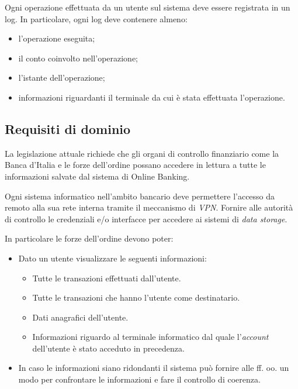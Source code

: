Ogni operazione effettuata da un utente sul sistema deve essere registrata in un log.
In particolare, ogni log deve contenere almeno:
\begin{itemize}
	\item l'operazione eseguita;
	\item il conto coinvolto nell'operazione;
	\item l'istante dell'operazione;
	\item informazioni riguardanti il terminale da cui \`e stata effettuata l'operazione.
\end{itemize}

\subsection{Requisiti di dominio}

La legislazione attuale richiede che gli organi di controllo finanziario come la Banca d'Italia e le forze dell'ordine possano accedere in lettura a tutte le informazioni salvate dal sistema di Online Banking.

Ogni sistema informatico nell'ambito bancario deve permettere l'accesso da remoto alla sua rete interna tramite il meccanismo di \emph{VPN}.
Fornire alle autorit\`a di controllo le credenziali e/o interfacce per accedere ai sistemi di \emph{data storage}.

In particolare le forze dell'ordine devono poter:
\begin{itemize}
    \item Dato un utente visualizzare le seguenti informazioni:
        \begin{itemize}
            \item Tutte le transazioni effettuati dall'utente.
            \item Tutte le transazioni che hanno l'utente come destinatario.
            \item Dati anagrafici dell'utente.
            \item Informazioni riguardo al terminale informatico dal quale l'\emph{account} dell'utente \`e stato acceduto in precedenza.
        \end{itemize}
    \item In caso le informazioni siano ridondanti il sistema pu\`o fornire alle ff. oo. un modo per confrontare le informazioni e fare il controllo di coerenza.
\end{itemize}


